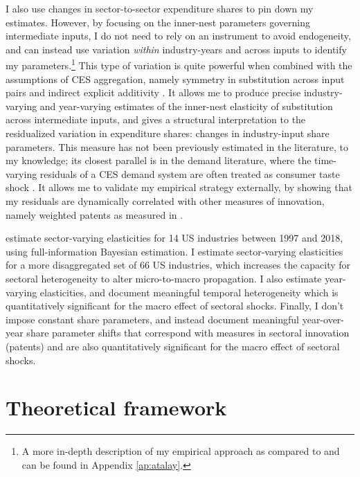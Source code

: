 \documentclass[11pt]{article}
\begin{document}
I also use changes in sector-to-sector expenditure shares to pin down my estimates. However, by focusing on the inner-nest parameters governing intermediate inputs, I do not need to rely on an instrument to avoid endogeneity, and can instead use variation \textit{within} industry-years and across inputs to identify my parameters.\footnote{A more in-depth description of my empirical approach as compared to \citet{atalayHowImportantAre2017} and \citet{miranda-pintoFlexibilityFrictionsMultisector2022} can be found in Appendix \ref{ap:atalay}.} This type of variation is quite powerful when combined with the assumptions of CES aggregation, namely symmetry in substitution across input pairs and indirect explicit additivity \citep{matsuyamaNonCESAggregatorsGuided2023}. It allows me to produce precise industry-varying and year-varying estimates of the inner-nest elasticity of substitution across intermediate inputs, and gives a structural interpretation to the residualized variation in expenditure shares: changes in industry-input share parameters. This measure has not been previously estimated in the literature, to my knowledge; its closest parallel is in the demand literature, where the time-varying residuals of a CES demand system are often treated as consumer taste shock \citep{reddingMeasuringAggregatePrice2020}. It allows me to validate my empirical strategy externally, by showing that my residuals are dynamically correlated with other measures of innovation, namely weighted patents as measured in \cite{koganTechnologicalInnovationResource2017}. 

\citet{comepoirierReallocationHeterogeneousElasticities2023} estimate sector-varying elasticities for 14 US industries between 1997 and 2018, using full-information Bayesian estimation. I estimate sector-varying elasticities for a more disaggregated set of 66 US industries, which increases the capacity for sectoral heterogeneity to alter micro-to-macro propagation. I also estimate year-varying elasticities, and document meaningful temporal heterogeneity which is quantitatively significant for the macro effect of sectoral shocks. Finally, I don't impose constant share parameters, and instead document meaningful year-over-year share parameter shifts that correspond with measures in sectoral innovation (patents) and are also quantitatively significant for the macro effect of sectoral shocks.

\section{Theoretical framework}
\label{sec:theory}
\end{document}
